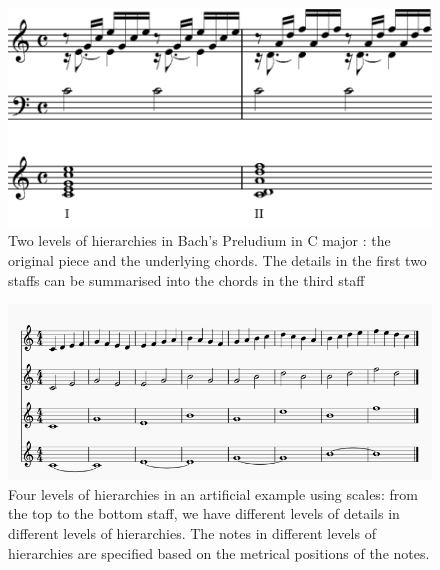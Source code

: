 \documentclass[acmsmall,10pt]{acmart}%
\begin{document}

\begin{figure}
  \includegraphics[width=0.7 \linewidth]{eg.png}
  \caption{Two levels of hierarchies in Bach's Preludium in C
          major \cite{wiki:bach}: the original piece and the underlying chords.
          The details in the first two staffs can be summarised into the chords
          in the third staff}
  \label{fig:egbach}
\end{figure}

\begin{figure}
  \includegraphics[width=0.7 \linewidth]{egscale.png}
  \caption{Four levels of hierarchies in an artificial example using
          scales: from the top to the bottom staff, we have different levels of
          details in different levels of hierarchies. The notes in different
          levels of hierarchies are specified based on the metrical positions of
          the notes.}
  \label{fig:egscale}
\end{figure}
\end{document}
